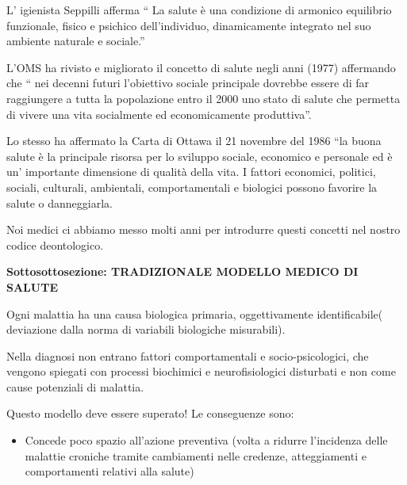 \documentclass[]{article}
\begin{document}
\begin{itemize}
  L' igienista Seppilli afferma `` La salute è una condizione di
  armonico equilibrio funzionale, fisico e psichico dell'individuo,
  dinamicamente integrato nel suo ambiente naturale e sociale.''

  L'OMS ha rivisto e migliorato il concetto di salute negli anni (1977)
  affermando che `` nei decenni futuri l'obiettivo sociale principale
  dovrebbe essere di far raggiungere a tutta la popolazione entro il
  2000 uno stato di salute che permetta di vivere una vita socialmente
  ed economicamente produttiva''.

  Lo stesso ha affermato la Carta di Ottawa il 21 novembre del 1986 ``la
  buona salute è la principale risorsa per lo sviluppo sociale,
  economico e personale ed è un' importante dimensione di qualità della
  vita. I fattori economici, politici, sociali, culturali, ambientali,
  comportamentali e biologici possono favorire la salute o danneggiarla.

  Noi medici ci abbiamo messo molti anni per introdurre questi concetti
  nel nostro codice deontologico.

  \textbf{Sottosottosezione: TRADIZIONALE MODELLO MEDICO DI SALUTE}

  Ogni malattia ha una causa biologica primaria, oggettivamente
  identificabile( deviazione dalla norma di variabili biologiche
  misurabili).

  Nella diagnosi non entrano fattori comportamentali e
  socio-psicologici, che vengono spiegati con processi biochimici e
  neurofisiologici disturbati e non come cause potenziali di malattia.

  Questo modello deve essere superato! Le conseguenze sono:
\end{itemize}

\begin{itemize}
\item
  Concede poco spazio all'azione preventiva (volta a ridurre l'incidenza
  delle malattie croniche tramite cambiamenti nelle credenze,
  atteggiamenti e comportamenti relativi alla salute)
\end{itemize}
\end{document}
